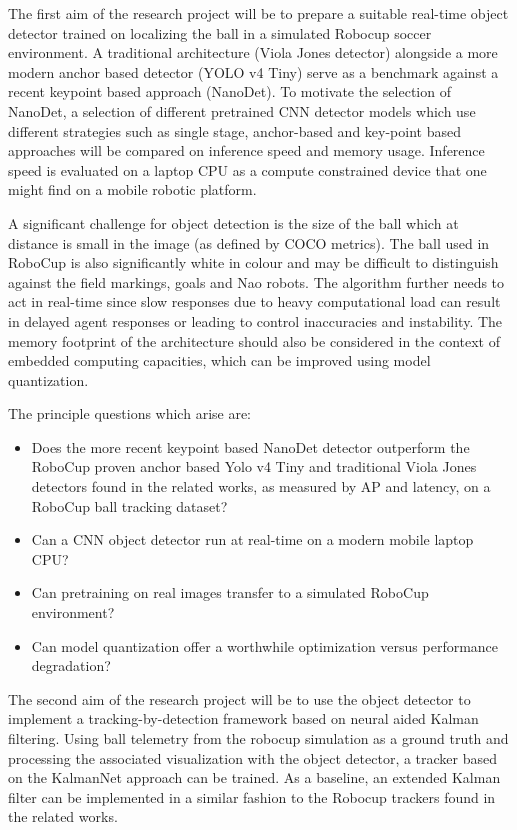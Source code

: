 \documentclass[a4paper,twoside,12pt]{report}
\begin{document}
The first aim of the research project will be to prepare a suitable real-time object detector trained on localizing the ball in a simulated Robocup soccer environment. A traditional architecture (Viola Jones detector) alongside a more modern anchor based detector (YOLO v4 Tiny) serve as a benchmark against a recent keypoint based approach (NanoDet). To motivate the selection of NanoDet, a selection of different pretrained CNN detector models which use different strategies such as single stage, anchor-based and key-point based approaches will be compared on inference speed and memory usage. Inference speed is evaluated on a laptop CPU as a compute constrained device that one might find on a mobile robotic platform. 

A significant challenge for object detection is the size of the ball which at distance is small in the image (as defined by COCO metrics). The ball used in RoboCup is also significantly white in colour and may be difficult to distinguish against the field markings, goals and Nao robots. The algorithm further needs to act in real-time since slow responses due to heavy computational load can result in delayed agent responses or leading to control inaccuracies and instability. The memory footprint of the architecture should also be considered in the context of embedded computing capacities, which can be improved using model quantization.

The principle questions which arise are:
\begin{itemize}
    \item Does the more recent keypoint based NanoDet detector outperform the RoboCup proven anchor based Yolo v4 Tiny and traditional Viola Jones detectors found in the related works, as measured by AP and latency, on a RoboCup ball tracking dataset? 
    \item Can a CNN object detector run at real-time on a modern mobile laptop CPU?
    \item Can pretraining on real images transfer to a simulated RoboCup environment?
    \item Can model quantization offer a worthwhile optimization versus performance degradation? 
\end{itemize}

The second aim of the research project will be to use the object detector to implement a tracking-by-detection framework based on neural aided Kalman filtering. Using ball telemetry from the robocup simulation as a ground truth and processing the associated visualization with the object detector, a tracker based on the KalmanNet approach can be trained. As a baseline, an extended Kalman filter can be implemented in a similar fashion to the Robocup trackers found in the related works. 
\end{document}
